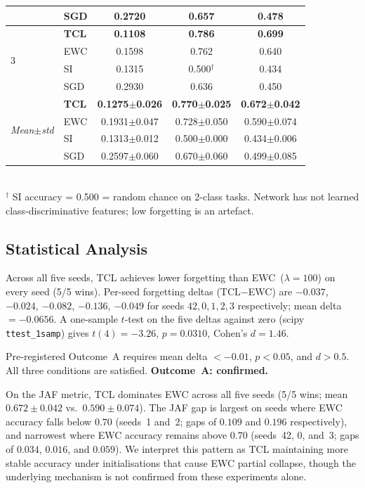 \begin{table}[h]
\begin{tabular}{llccc}
 & SGD          & 0.2720          & 0.657          & 0.478          \\
\midrule
\multirow{4}{*}{3}
 & \textbf{TCL} & \textbf{0.1108} & \textbf{0.786} & \textbf{0.699} \\
 & EWC          & 0.1598          & 0.762          & 0.640          \\
 & SI           & 0.1315          & 0.500$^\dagger$& 0.434          \\
 & SGD          & 0.2930          & 0.636          & 0.450          \\
\midrule
\multirow{4}{*}{\textit{Mean$\pm$std}}
 & \textbf{TCL} & \textbf{0.1275$\pm$0.026} & \textbf{0.770$\pm$0.025} & \textbf{0.672$\pm$0.042} \\
 & EWC          & 0.1931$\pm$0.047          & 0.728$\pm$0.050          & 0.590$\pm$0.074          \\
 & SI           & 0.1313$\pm$0.012          & 0.500$\pm$0.000           & 0.434$\pm$0.006          \\
 & SGD          & 0.2597$\pm$0.060          & 0.670$\pm$0.060           & 0.499$\pm$0.085          \\
\bottomrule
\end{tabular}
\\[4pt]
\small $^\dagger$ SI accuracy = 0.500 = random chance on 2-class tasks.
Network has not learned class-discriminative features; low forgetting is an artefact.
\end{table}

\subsection{Statistical Analysis}
\label{sec:stats}

Across all five seeds, TCL achieves lower forgetting than EWC~($\lambda=100$) on every
seed (5/5 wins).
Per-seed forgetting deltas (TCL$-$EWC) are
$-0.037$, $-0.024$, $-0.082$, $-0.136$, $-0.049$ for seeds $42, 0, 1, 2, 3$
respectively; mean delta $= -0.0656$.
A one-sample $t$-test on the five deltas against zero (scipy \texttt{ttest\_1samp})
gives $t(4) = -3.26$, $p = 0.0310$, Cohen's $d = 1.46$.

Pre-registered Outcome~A requires mean delta $< -0.01$, $p < 0.05$, and $d > 0.5$.
All three conditions are satisfied.
\textbf{Outcome~A: confirmed.}

On the JAF metric, TCL dominates EWC across all five seeds (5/5 wins;
mean $0.672 \pm 0.042$ vs.\ $0.590 \pm 0.074$).
The JAF gap is largest on seeds where EWC accuracy falls below $0.70$
(seeds~1 and~2; gaps of $0.109$ and $0.196$ respectively),
and narrowest where EWC accuracy remains above $0.70$
(seeds~42, 0, and~3; gaps of $0.034$, $0.016$, and $0.059$).
We interpret this pattern as TCL maintaining more stable accuracy under
initialisations that cause EWC partial collapse, though the underlying mechanism
is not confirmed from these experiments alone.

